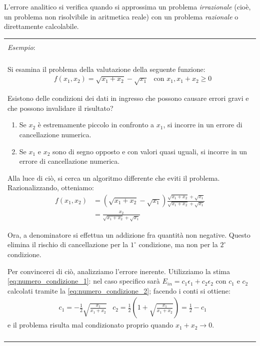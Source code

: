 \documentclass{article}
\numberwithin{equation}{section}
\newenvironment{example}
{\begin{center}
        \begin{tabular}{|p{0.9\textwidth}|}
            \hline \\ 
            \textit{Esempio}: \\\\ 
        }
        {
            \\\\ \hline
        \end{tabular}
    \end{center}
}
\begin{document}
L'errore analitico si verifica quando si approssima un problema
\emph{irrazionale} (cioè, un problema non risolvibile in aritmetica reale)
con un problema \emph{razionale} o direttamente calcolabile.
\begin{example}
    Si esamina il problema della valutazione della seguente funzione:
    \begin{equation*}
        \begin{aligned}
            & f(x_1,x_2)=\sqrt{x_1+x_2}-\sqrt{x_1} & \text{con }x_1
            ,x_1+x_2\geq 0
        \end{aligned}
    \end{equation*}

    Esistono delle condizioni dei dati in ingresso che possono causare errori
    gravi e che possono invalidare il risultato?

    \begin{enumerate}
        \item Se $x_2$ è estremamente piccolo in confronto a $x_1$, si
            incorre in un errore di cancellazione numerica.
        \item Se $x_1$ e $x_2$ sono di segno opposto e con valori quasi
            uguali, si incorre in un errore di cancellazione numerica.
    \end{enumerate}

    Alla luce di ciò, si  cerca un algoritmo differente che eviti il problema. 
    Razionalizzando, otteniamo: 
    \begin{equation*}
       \begin{aligned}
            f(x_1,x_2)&=(\sqrt{x_1+x_2}-\sqrt{x_1})\frac{\sqrt{x_1+x_2}+\sqrt{x_1}}{\sqrt{x_1+x_2}+\sqrt{x_1}}
            \\ 
                      &= \frac{x_2}{\sqrt{x_1+x_2}+\sqrt{x_1}}
       \end{aligned} 
    \end{equation*}

    Ora, a denominatore si effettua un addizione fra quantità non negative. 
    Questo elimina il rischio di cancellazione per la $1^{\circ}$ condizione,
    ma non per la $2^{\circ}$ condizione. 

    Per convincerci di ciò, analizziamo l'errore inerente. 
    Utilizziamo la stima \ref{eq:numero_condizione_1}: 
    nel caso specifico sarà $E_{in}=c_1\epsilon_1+c_2\epsilon_2$ con $c_1$ e $c_2$
    calcolati tramite la \ref{eq:numero_condizione_2}; facendo i conti si
    ottiene:
    \begin{equation*}
       \begin{aligned}
           & c_1=-\frac{1}{2}\sqrt{\frac{x_1}{x_1+x_2}} &
           c_2=\frac{1}{2}(1+\sqrt{\frac{x_1}{x_1+x_2}})=\frac{1}{2}-c_1
       \end{aligned} 
    \end{equation*}
    e il problema risulta mal condizionato proprio quando $x_1+x_2\rightarrow
    0$.


\end{example}
\end{document}
